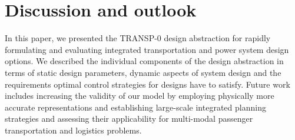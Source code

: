 \section{Discussion and outlook}
\label{conclusion}

In this paper, we presented the TRANSP-0 design abstraction for rapidly formulating and evaluating integrated transportation and power system design options. We described the individual components of the design abstraction in terms of static design parameters, dynamic aspects of system design and the requirements optimal control strategies for designs have to satisfy.
Future work includes increasing the validity of our model by employing physically more accurate representations and establishing large-scale integrated planning strategies and assessing their applicability for multi-modal passenger transportation and logistics problems.

